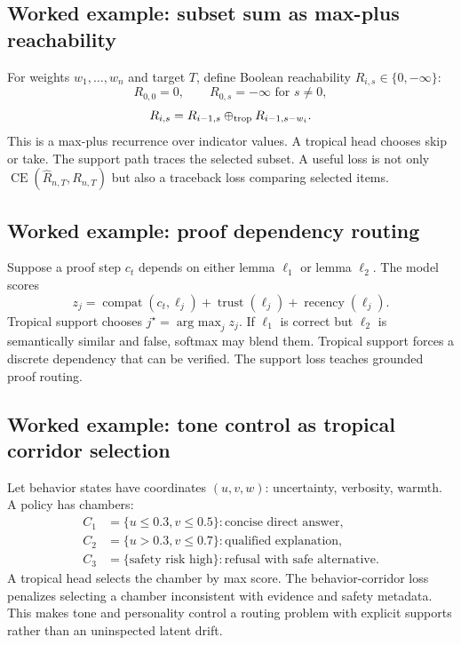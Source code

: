 \documentclass[11pt]{article}
\newcommand{\oplusT}{\oplus_{\rm trop}}
\newcommand{\argmax}{\operatorname*{arg\ max}}
\begin{document}
\subsection{Worked example: subset sum as max-plus reachability}

For weights \(w_1,\ldots,w_n\) and target \(T\), define Boolean reachability \(R_{i,s}\in\{0,-\infty\}\):
\begin{equation}
R_{0,0}=0,
\qquad R_{0,s}=-\infty \text{ for } s\ne0,
\end{equation}
\begin{equation}
R_{i,s}=R_{i-1,s}\oplusT R_{i-1,s-w_i}.
\end{equation}
This is a max-plus recurrence over indicator values.  A tropical head chooses skip or take.  The support path traces the selected subset.  A useful loss is not only \(\operatorname{CE}(\hat R_{n,T},R_{n,T})\) but also a traceback loss comparing selected items.

\subsection{Worked example: proof dependency routing}

Suppose a proof step \(c_t\) depends on either lemma \(\ell_1\) or lemma \(\ell_2\).  The model scores
\begin{equation}
z_j=\operatorname{compat}(c_t,\ell_j)+\operatorname{trust}(\ell_j)+\operatorname{recency}(\ell_j).
\end{equation}
Tropical support chooses \(j^\star=\argmax_j z_j\).  If \(\ell_1\) is correct but \(\ell_2\) is semantically similar and false, softmax may blend them.  Tropical support forces a discrete dependency that can be verified.  The support loss teaches grounded proof routing.

\subsection{Worked example: tone control as tropical corridor selection}

Let behavior states have coordinates \((u,v,w)\): uncertainty, verbosity, warmth.  A policy has chambers:
\begin{align}
C_1&=\{u\le 0.3, v\le0.5\}: \text{concise direct answer},\\
C_2&=\{u>0.3, v\le0.7\}: \text{qualified explanation},\\
C_3&=\{\text{safety risk high}\}: \text{refusal with safe alternative}.
\end{align}
A tropical head selects the chamber by max score.  The behavior-corridor loss penalizes selecting a chamber inconsistent with evidence and safety metadata.  This makes tone and personality control a routing problem with explicit supports rather than an uninspected latent drift.
\end{document}
